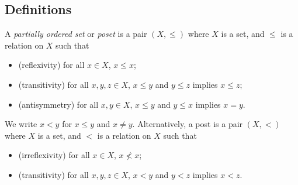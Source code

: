 \subsection{Definitions}
\begin{definition}
    A \emph{partially ordered set} or \emph{poset} is a pair \( (X, \leq) \) where \( X \) is a set, and \( \leq \) is a relation on \( X \) such that
    \begin{itemize}
        \item (reflexivity) for all \( x \in X \), \( x \leq x \);
        \item (transitivity) for all \( x, y, z \in X \), \( x \leq y \) and \( y \leq z \) implies \( x \leq z \);
        \item (antisymmetry) for all \( x, y \in X \), \( x \leq y \) and \( y \leq x \) implies \( x = y \).
    \end{itemize}
\end{definition}
We write \( x < y \) for \( x \leq y \) and \( x \neq y \).
Alternatively, a post is a pair \( (X, <) \) where \( X \) is a set, and \( < \) is a relation on \( X \) such that
\begin{itemize}
    \item (irreflexivity) for all \( x \in X \), \( x \not < x \);
    \item (transitivity) for all \( x, y, z \in X \), \( x < y \) and \( y < z \) implies \( x < z \).
\end{itemize}
